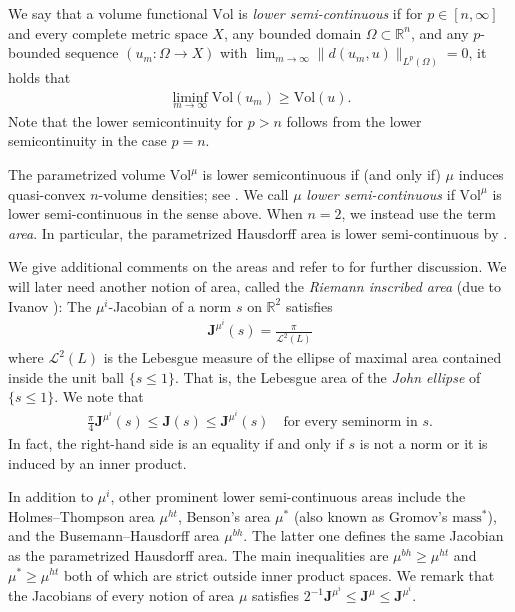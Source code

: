\documentclass[a4paper,leqno]{amsart}
\numberwithin{equation}{section}
\theoremstyle{remark}
\theoremstyle{remark}
\newcommand{\lm}{\mathscr{L}}
\begin{document}
We say that a volume functional $\mathrm{Vol}$ is \emph{lower semi-continuous} if for $p \in [n,\infty]$ and every complete metric space $X$, any bounded domain $\Omega \subset \mathbb{R}^n$, and any $p$-bounded sequence $( u_m \colon \Omega \to X )$ with $\lim_{ m \to \infty } \| d( u_m, u ) \|_{ L^{p}(\Omega) } = 0$, it holds that
\begin{align*}
    \liminf_{ m \to \infty } \mathrm{Vol}( u_m ) \geq \mathrm{Vol}( u ).
\end{align*}
Note that the lower semicontinuity for $p > n$ follows from the lower semicontinuity in the case $p = n$.

The parametrized volume $\mathrm{Vol}^{\mu}$ is lower semicontinuous if (and only if) $\mu$ induces quasi-convex $n$-volume densities; see \cite[Definition 2.6 and Corollary 5.8]{Lyt:Wen:17:areamini}. We call $\mu$ \emph{lower semi-continuous} if $\mathrm{Vol}^{\mu}$ is lower semi-continuous in the sense above. When $n = 2$, we instead use the term \emph{area}. In particular, the parametrized Hausdorff area is lower semi-continuous by \cite[Theorem 1]{burago-ivanov-2012-minimality-of-planes-in-normed-spaces}.


We give additional comments on the areas and refer to \cite[Section 2.4]{Lyt:Wen:17:energyarea} for further discussion. We will later need another notion of area, called the \emph{Riemann inscribed area} (due to Ivanov \cite{ivanov-2008-volumes-and-areas-lipschitz-metrics}): The $\mu^{i}$-Jacobian of a norm $s$ on $\mathbb{R}^2$ satisfies
\begin{align*}
    \mathbf{J}^{\mu^{i}}(s)
    =
    \frac{ \pi }{ \lm^{2}(L) }
\end{align*}
where $\lm^{2}(L)$ is the Lebesgue measure of the ellipse of maximal area contained inside the unit ball $\{s \leq 1\}$. That is, the Lebesgue area of the \emph{John ellipse} of $\{ s \leq 1 \}$. We note that
\begin{align*}
    \frac{\pi}{4} \mathbf{J}^{\mu^{i}}(s) \leq \mathbf{J}(s) \leq \mathbf{J}^{\mu^{i}}(s)
    \quad\text{for every seminorm in $s$.}
\end{align*}
In fact, the right-hand side is an equality if and only if $s$ is not a norm or it is induced by an inner product. 

In addition to $\mu^{i}$, other prominent lower semi-continuous areas include the Holmes--Thompson area $\mu^{ht}$, Benson's area $\mu^{*}$ (also known as Gromov's $\text{mass}^{*}$), and the Busemann--Hausdorff area $\mu^{bh}$. The latter one defines the same Jacobian as the parametrized Hausdorff area. The main inequalities are $\mu^{bh} \geq \mu^{ht}$ and $\mu^{*} \geq \mu^{ht}$ both of which are strict outside inner product spaces. We remark that the Jacobians of every notion of area $\mu$ satisfies $2^{-1}\mathbf{J}^{\mu^{i}} \leq \mathbf{J}^\mu \leq \mathbf{J}^{ \mu^{i} }$.
\end{document}
